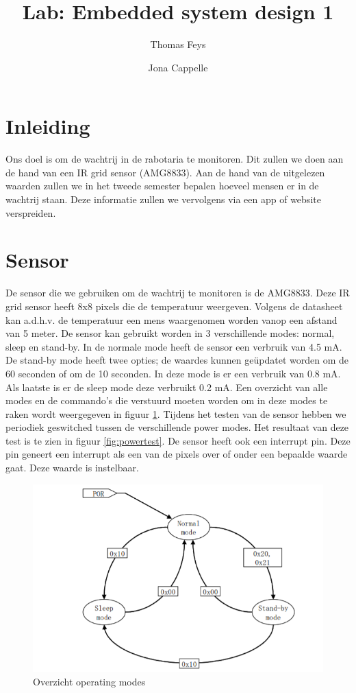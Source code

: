 \documentclass[]{article}
\title{Lab: Embedded system design 1}
\author{Thomas Feys \and Jona Cappelle}
\begin{document}
\maketitle

\newpage

\tableofcontents

\newpage

\section{Inleiding}
Ons doel is om de wachtrij in de rabotaria te monitoren. Dit zullen we doen aan de hand van een IR grid sensor (AMG8833). Aan de hand van de uitgelezen waarden zullen we in het tweede semester bepalen hoeveel mensen er in de wachtrij staan. Deze informatie zullen we vervolgens via een app of website verspreiden.


\section{Sensor}
De sensor die we gebruiken om de wachtrij te monitoren is de AMG8833. Deze IR grid sensor heeft 8x8 pixels die de temperatuur weergeven. Volgens de datasheet kan a.d.h.v. de temperatuur een mens waargenomen worden vanop een afstand van 5 meter. De sensor kan gebruikt worden in 3 verschillende modes: normal, sleep en stand-by. In de normale mode heeft de sensor een verbruik van 4.5 mA. De stand-by mode heeft twee opties; de waardes kunnen geüpdatet worden om de 60 seconden of om de 10 seconden. In deze mode is er een verbruik van 0.8 mA. Als laatste is er de sleep mode deze verbruikt 0.2 mA. Een overzicht van alle modes en de commando's die verstuurd moeten worden om in deze modes te raken wordt weergegeven in figuur \ref{fig:operatingmodes}. Tijdens het testen van de sensor hebben we periodiek geswitched tussen de verschillende power modes. Het resultaat van deze test is te zien in figuur \ref{fig:powertest}. De sensor heeft ook een interrupt pin. Deze pin geneert een interrupt als een van de pixels over of onder een bepaalde waarde gaat. Deze waarde is instelbaar.	

\begin{figure}[!ht]
	\centering
	\includegraphics[width=\columnwidth]{operatingmodes.png}
	\caption{Overzicht operating modes}
	\label{fig:operatingmodes}
\end{figure}
\end{document}
